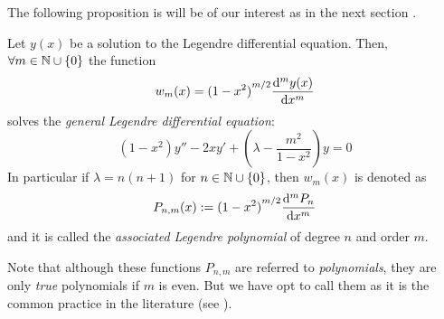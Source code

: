 \documentclass[../main.tex]{subfiles}
\begin{document}
The following proposition is will be of our interest as in the next section \cite{mathematical_methods}.
\begin{proposition}\label{prop:associate_legendre}
  Let $y(x)$ be a solution to the Legendre differential equation. Then, $\forall m\in\mathbb{N}\cup\{0\}$ the function
  \begin{equation}
    w_m(x)={(1-x^2)}^{m/2} \dv[m]{y(x)}{x}
  \end{equation}
  solves the \emph{general Legendre differential equation}:
  \begin{equation}
    (1-x^2)y''-2xy'+\left(\lambda - \frac{m^2}{1-x^2}\right) y=0
  \end{equation}
  In particular if $\lambda=n(n+1)$ for $n\in\mathbb{N}\cup\{0\}$, then $w_m(x)$ is denoted as
  \begin{equation}\label{eq:associated_legendre_polynomials}
    P_{n,m}(x):={(1-x^2)}^{m/2} \dv[m]{P_n}{x}
  \end{equation}
  and it is called the \emph{associated Legendre polynomial} of degree $n$ and order $m$.
\end{proposition}
Note that although these functions $P_{n,m}$ are referred to \emph{polynomials}, they are only \emph{true} polynomials if $m$ is even. But we have opt to call them as it is the common practice in the literature (see \cite{wolfram_associated_legendre_polynomials}).
\end{document}
